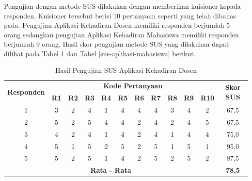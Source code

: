 \par Pengujian dengan metode SUS dilakukan dengan memberikan kuisioner kepada responden. Kuisioner tersebut berisi 10 pertanyaan seperti yang telah dibahas pada. Pengujian Aplikasi Kehadiran Dosen memiliki responden berjumlah 5 orang sedangkan pengujian Aplikasi Kehadiran Mahasiswa memiliki responden berjumlah 9 orang. Hasil skor pengujian metode SUS yang dilakukan dapat dilihat pada Tabel \ref{sus-aplikasi-dosen} dan Tabel \ref{sus-aplikasi-mahasiswa} berikut. 
\begin{table}[H]
\fontsize{10}{12}\selectfont
\center
\caption{Hasil Pengujian SUS Aplikasi Kehadiran Dosen}
\label{sus-aplikasi-dosen}
\begin{tabular}{|c|c|c|c|c|c|c|c|c|c|c|c|}
\hline
\multirow{2}{*}{\textbf{Responden}} & \multicolumn{10}{c|}{\textbf{Kode Pertanyaan}}                                                                                                                  & \multirow{2}{*}{\textbf{Skor SUS}} \\ \cline{2-11}
                                    & \textbf{R1} & \textbf{R2} & \textbf{R3} & \textbf{R4} & \textbf{R5} & \textbf{R6} & \textbf{R7} & \textbf{R8} & \textbf{R9} & \multicolumn{1}{l|}{\textbf{R10}} &                                    \\ \hline
1                                   & 3           & 2           & 4           & 1           & 4           & 4           & 4           & 3           & 4           & 2                                 & 67,5                               \\ \hline
2                                   & 5           & 2           & 5           & 4           & 4           & 2           & 4           & 2           & 4           & 5                                 & 67,5                               \\ \hline
3                                   & 4           & 2           & 4           & 1           & 4           & 2           & 4           & 1           & 4           & 4                                 & 75,0                                 \\ \hline
4                                   & 5           & 1           & 5           & 2           & 5           & 2           & 5           & 1           & 5           & 1                                 & 95,0                                 \\ \hline
5                                   & 5           & 2           & 5           & 1           & 4           & 2           & 5           & 2           & 5           & 2                                 & 87,5                               \\ \hline
\multicolumn{11}{|c|}{\textbf{Rata - Rata}}                                                                                                                                                           & \textbf{78,5}                      \\ \hline
\end{tabular}
\end{table}

